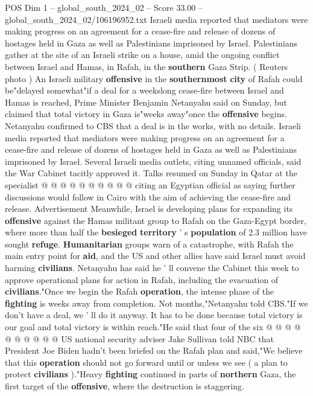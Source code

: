 \begin{textsample}{POS Dim 1 – global\_south\_2024\_02 – Score 33.00 – global\_south\_2024\_02/106196952.txt}  \label{ex:f1_pos_024}
Israeli media reported that mediators were making progress on an agreement for a cease-fire and release of dozens of hostages held in Gaza as well as Palestinians imprisoned by Israel.
Palestinians gather at the site of an Israeli strike on a house, amid the ongoing conflict between Israel and Hamas, in Rafah, in the \textbf{southern} Gaza Strip. ( Reuters photo ) An Israeli military \textbf{offensive} in the \textbf{southernmost} \textbf{city} of Rafah could be"delayed somewhat"if a deal for a weekslong cease-fire between Israel and Hamas is reached, Prime Minister Benjamin Netanyahu said on Sunday, but claimed that total victory in Gaza is"weeks away"once the \textbf{offensive} begins.
Netanyahu confirmed to CBS that a deal is in the works, with no details.
Israeli media reported that mediators were making progress on an agreement for a cease-fire and release of dozens of hostages held in Gaza as well as Palestinians imprisoned by Israel.
Several Israeli media outlets, citing unnamed officials, said the War Cabinet tacitly approved it.
Talks resumed on Sunday in Qatar at the specialist @ @ @ @ @ @ @ @ @ @ citing an Egyptian official as saying further discussions would follow in Cairo with the aim of achieving the cease-fire and release.
Advertisement Meanwhile, Israel is developing plans for expanding its \textbf{offensive} against the Hamas militant group to Rafah on the Gaza-Egypt border, where more than half the \textbf{besieged} \textbf{territory} ' s \textbf{population} of 2.3 million have sought \textbf{refuge}. \textbf{Humanitarian} groups warn of a catastrophe, with Rafah the main entry point for \textbf{aid}, and the US and other allies have said Israel must avoid harming \textbf{civilians}.
Netanyahu has said he ' ll convene the Cabinet this week to approve operational plans for action in Rafah, including the evacuation of \textbf{civilians}."Once we begin the Rafah \textbf{operation}, the intense phase of the \textbf{fighting} is weeks away from completion.
Not months,"Netanyahu told CBS."If we don't have a deal, we ' ll do it anyway.
It has to be done because total victory is our goal and total victory is within reach."He said that four of the six @ @ @ @ @ @ @ @ @ @ US national security adviser Jake Sullivan told NBC that President Joe Biden hadn't been briefed on the Rafah plan and said,"We believe that this \textbf{operation} should not go forward until or unless we see ( a plan to protect \textbf{civilians} )."Heavy \textbf{fighting} continued in parts of \textbf{northern} Gaza, the first target of the \textbf{offensive}, where the destruction is staggering.

\end{textsample}
